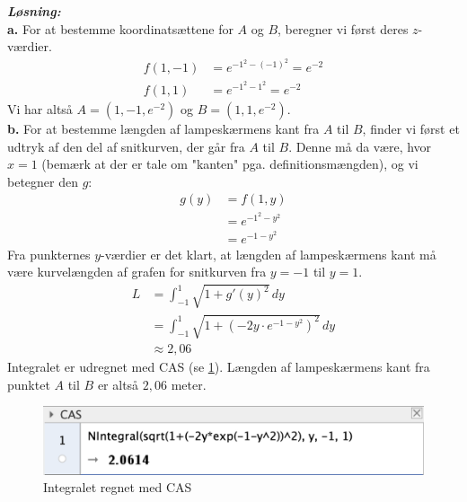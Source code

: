 \documentclass{article}
\newcommand{\sol}{\setlength{\parindent}{0cm}\textbf{\textit{Løsning:}}\setlength{\parindent}{1cm}}
\begin{document}
\sol \\
\textbf{a.}
For at bestemme koordinatsættene for $A$ og $B$, beregner vi først deres $z$-værdier. 
\begin{equation*}
\begin{split}
  f(1,-1)&= e^{-1^2-\left(-1\right)^2} =e^{-2}\\
  f(1,1)&=e^{-1^2-1^2} = e^{-2} 
\end{split}
\end{equation*}
Vi har altså $A=(1,-1,e^{-2})$ og $B=(1,1,e^{-2})$.\\[1ex]
\textbf{b.}
For at bestemme længden af lampeskærmens kant fra $A$ til $B$, finder vi først et udtryk af den del af snitkurven, der går fra $A$ til $B$. 
Denne må da være, hvor $x=1$ (bemærk at der er tale om "kanten" pga. definitionsmængden), og vi betegner den $g$:
\begin{equation*}
\begin{split}
  g(y)&=f(1,y)\\
  &=e^{-1^2-y^2} \\
  &=e^{-1-y^2} 
\end{split}
\end{equation*}
Fra punkternes $y$-værdier er det klart, at længden af lampeskærmens kant må være kurvelængden af grafen for snitkurven fra $y=-1$ til $y=1$.
\begin{equation*}
\begin{split}
  L&=\int_{-1}^{1} \sqrt{1+g'(y)^2}  \,dy \\
  &=\int_{-1}^{1} \sqrt{1+ \left(-2y \cdot e^{-1-y^2} \right)^2}  \,dy \\
  &\approx 2,06
\end{split}
\end{equation*}
Integralet er udregnet med CAS (se \cref{fig:CAS}).
Længden af lampeskærmens kant fra punktet $A$ til $B$ er altså $2,06$ meter. 
\begin{figure}[H]
\begin{center}
  \includegraphics[width=\textwidth]{CAS.png}
\end{center}
\caption{Integralet regnet med CAS}
\label{fig:CAS}
\end{figure}
\end{document}
